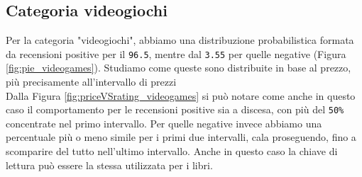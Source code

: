		\subsection{Categoria videogiochi}
			Per la categoria "videogiochi", abbiamo una distribuzione probabilistica formata da recensioni positive per il \verb|96.5|, mentre dal \verb|3.55| per quelle negative (Figura \ref{fig:pie_videogames}). Studiamo come queste sono distribuite in base al prezzo, più precisamente all'intervallo di prezzi\\
			Dalla Figura \ref{fig:priceVSrating_videogames} si può notare come anche in questo caso il comportamento per le recensioni positive sia a discesa, con più del \verb|50%| concentrate nel primo intervallo. Per quelle negative invece abbiamo una percentuale più o meno simile per i primi due intervalli, cala proseguendo, fino a scomparire del tutto nell'ultimo intervallo. Anche in questo caso la chiave di lettura può essere la stessa utilizzata per i libri. 
		
